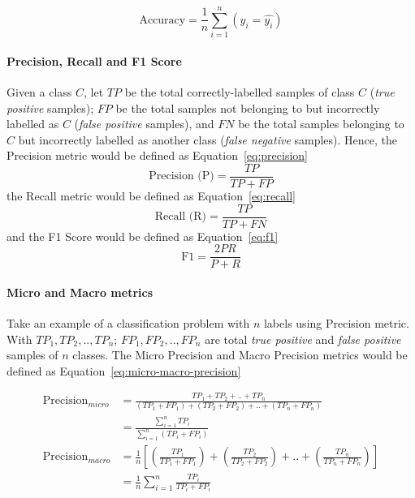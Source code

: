\documentclass[sn-mathphys,Numbered]{sn-jnl}%
\theoremstyle{thmstyleone}%
\theoremstyle{thmstyletwo}%
\theoremstyle{thmstylethree}%
\begin{document}
\begin{equation}\label{eq:accuracy}
\text{Accuracy} = \frac{1}{n}\displaystyle\sum_{i = 1}^n (y_i = \hat{y_i})
\end{equation}

\paragraph{Precision, Recall and F1 Score}
Given a class $C$, let $TP$ be the total correctly-labelled samples of class $C$ (\textit{true positive} samples); $FP$ be the total samples not belonging to but incorrectly labelled as $C$ (\textit{false positive} samples), and $FN$ be the total samples belonging to $C$ but incorrectly labelled as another class (\textit{false negative} samples). Hence, the Precision metric would be defined as Equation~\ref{eq:precision}
\begin{equation}\label{eq:precision}
\text{Precision (P)} = \frac{TP}{TP + FP}    
\end{equation}
the Recall metric would be defined as Equation~\ref{eq:recall}
\begin{equation}\label{eq:recall}
\text{Recall (R)} = \frac{TP}{TP + FN}
\end{equation}
and the F1 Score would be defined as Equation~\ref{eq:f1}
\begin{equation}\label{eq:f1}
\text{F1} = \frac{2PR}{P + R}
\end{equation}

\paragraph{Micro and Macro metrics}
Take an example of a classification problem with $n$ labels using Precision metric. With $TP_1, TP_2, .., TP_n$; $FP_1, FP_2, .., FP_n$ are total \textit{true positive} and \textit{false positive} samples of $n$ classes. The Micro Precision and Macro Precision metrics would be defined as Equation~\ref{eq:micro-macro-precision}

\begin{equation}\label{eq:micro-macro-precision}
\begin{aligned}
\text{Precision}_{micro} &= \frac{TP_1 + TP_2 + .. + TP_n}{(TP_1 + FP_1) + (TP_2 + FP_2) + .. + (TP_n + FP_n)} \\
&= \frac{\displaystyle\sum_{i = 1}^n TP_i}{\displaystyle\sum_{i = 1}^n (TP_i + FP_i)} \\
\text{Precision}_{macro} &= \frac{1}{n}\left[\left(\frac{TP_1}{TP_1 + FP_1}\right) + \left(\frac{TP_2}{TP_2 + FP_2}\right) + .. + \left(\frac{TP_n}{TP_n + FP_n}\right)\right] \\
&= \frac{1}{n}\sum_{i = 1}^n \frac{TP_i}{TP_i + FP_i}
\end{aligned}
\end{equation}
\end{document}
